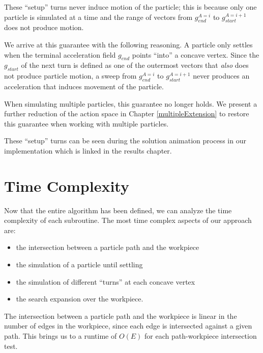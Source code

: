 These ``setup'' turns never induce motion of the particle; this is because only one particle is simulated at a time and the range of vectors from $g_{end}^{A=i}$ to $g_{start}^{A=i + 1}$ does not produce motion.

We arrive at this guarantee with the following reasoning. A particle only settles when the terminal acceleration field $g_{end}$ points ``into'' a concave vertex. Since the $g_{start}$ of the next turn is defined as one of the outermost vectors that \emph{also} does not produce particle motion, a sweep from $g_{end}^{A=i}$ to $g_{start}^{A=i + 1}$ never produces an acceleration that induces movement of the particle.

When simulating multiple particles, this guarantee no longer holds. We present a further reduction of the action space in Chapter \ref{multipleExtension} to restore this guarantee when working with multiple particles.


These ``setup'' turns can be seen during the solution animation process in our implementation which is linked in the results chapter.


  \section{Time Complexity}

Now that the entire algorithm has been defined, we can analyze the time complexity of each subroutine. The most time complex aspects of our approach are:

\begin{itemize}
\item the intersection between a particle path and the workpiece
\item the simulation of a particle until settling
\item the simulation of different ``turns'' at each concave vertex
\item the search expansion over the workpiece.
\end{itemize}

The intersection between a particle path and the workpiece is linear in the number of edges in the workpiece, since each edge is intersected against a given path. This brings us to a runtime of $O(E)$ for each path-workpiece intersection test.

